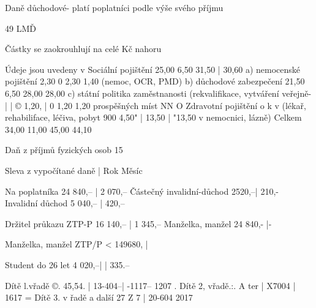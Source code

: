 Daně důchodové- platí poplatníci podle výše svého příjmu

49
\newpage
LMĎ



Částky se zaokrouhlují na celé Kč nahoru















Údeje jsou uvedeny v %
Sociální pojištění 25,00 6,50 31,50 | 30,60
a) nemocenské pojištění 2,30 0 2,30 1,40
(nemoc, OCR, PMD)
b) důchodové zabezpečení 21,50 6,50 28,00 28,00
c) státní politika zaměstnanosti
(rekvalifikace, vytváření veřejně- | | © 1,20, | 0 1,20 1,20
prospěšných míst NN O
Zdravotní pojištění o k v
(lékař, rehabiliface, léčiva, pobyt 900 4,50" | 13,50 | "13,50
v nemocnici, lázně)
Celkem 34,00 11,00 45,00 44,10











Daň z příjmů fyzických osob 15 %

































Sleva z vypočítané daně | Rok Měsíc

Na poplatníka 24 840,-- | 2 070,--
Částečný invalidní-důchod 2520,--| 210,-
Invalidní důchod 5 040,-- |  420,--

Držitel průkazu ZTP-P 16 140,-- | 1 345,--
Manželka, manžel 24 840,- |-

Manželka, manžel ZTP/P < 149680, |

Student do 26 let 4 020,--| | 335.--

Dítě l.vřadě ©. 45,54. | 13-404--| -1117-- 1207 .
Dítě 2, vřadě.:. A ter | X7004 | 1617 =
Dítě 3. v řadě a další 27 Z 7 | 20-604 2017



